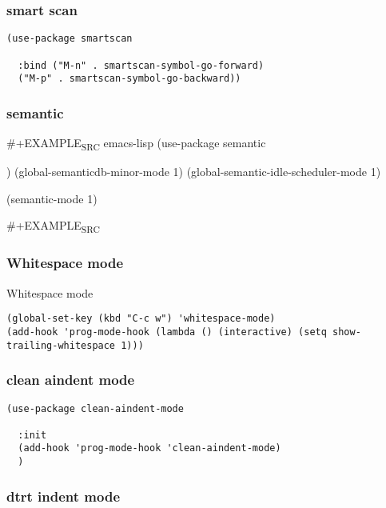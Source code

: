 \documentclass[12pt]{article}
\begin{document}
\subsubsection{smart scan}
\label{sec:org5a91dd6}

\begin{verbatim}
(use-package smartscan

  :bind ("M-n" . smartscan-symbol-go-forward)
  ("M-p" . smartscan-symbol-go-backward))

\end{verbatim}

\subsubsection{semantic}
\label{sec:org5d5fc00}


\#+EXAMPLE\textsubscript{SRC} emacs-lisp
(use-package semantic

)
(global-semanticdb-minor-mode 1)
(global-semantic-idle-scheduler-mode 1)

(semantic-mode 1)

\#+EXAMPLE\textsubscript{SRC}
\subsubsection{Whitespace mode}
\label{sec:orgd338016}

Whitespace mode

\begin{verbatim}
(global-set-key (kbd "C-c w") 'whitespace-mode)
(add-hook 'prog-mode-hook (lambda () (interactive) (setq show-trailing-whitespace 1)))
\end{verbatim}

\subsubsection{clean aindent mode}
\label{sec:org302e211}

\begin{verbatim}
(use-package clean-aindent-mode

  :init 
  (add-hook 'prog-mode-hook 'clean-aindent-mode)
  )
\end{verbatim}

\subsubsection{dtrt indent mode}
\label{sec:org5bab403}
\end{document}
